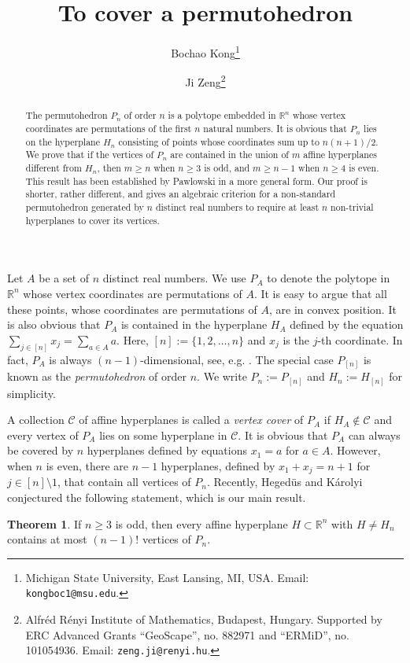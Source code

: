 \documentclass[11pt]{article}
\date{}
\title{To cover a permutohedron}
\author{Bochao Kong\thanks{Michigan State University, East Lansing, MI, USA. Email: {\tt kongboc1@msu.edu}.} \and Ji Zeng\thanks{Alfréd Rényi Institute of Mathematics, Budapest, Hungary. Supported by ERC Advanced Grants ``GeoScape'', no. 882971 and ``ERMiD'', no. 101054936. Email: {\tt zeng.ji@renyi.hu}.}}
\theoremstyle{definition}
\newtheorem{theorem}{Theorem}
\begin{document}
\maketitle

\begin{abstract}
  The permutohedron $P_n$ of order $n$ is a polytope embedded in $\mathbb{R}^n$ whose vertex coordinates are permutations of the first $n$ natural numbers. It is obvious that $P_n$ lies on the hyperplane $H_n$ consisting of points whose coordinates sum up to $n(n+1)/2$. We prove that if the vertices of $P_n$ are contained in the union of $m$ affine hyperplanes different from $H_n$, then $m\geq n$ when $n \geq 3$ is odd, and $m \geq n-1$ when $n \geq 4$ is even. This result has been established by Pawlowski in a more general form. Our proof is shorter, rather different, and gives an algebraic criterion for a non-standard permutohedron generated by $n$ distinct real numbers to require at least $n$ non-trivial hyperplanes to cover its vertices.
\end{abstract}


Let $A$ be a set of $n$ distinct real numbers. We use $P_A$ to denote the polytope in $\mathbb{R}^n$ whose vertex coordinates are permutations of $A$. It is easy to argue that all these points, whose coordinates are permutations of $A$, are in convex position. It is also obvious that $P_A$ is contained in the hyperplane $H_A$ defined by the equation $\sum_{j\in [n]} x_j = \sum_{a\in A} a$. Here, $[n] := \{1,2,\dots,n\}$ and $x_j$ is the $j$-th coordinate. In fact, $P_A$ is always $(n-1)$-dimensional, see, e.g. \cite{ziegler1995lectures}. The special case $P_{[n]}$ is known as the \textit{permutohedron} of order $n$. We write $P_n := P_{[n]}$ and $H_n := H_{[n]}$ for simplicity.

A collection $\mathcal{C}$ of affine hyperplanes is called a \textit{vertex cover} of $P_A$ if $H_A \not\in \mathcal{C}$ and every vertex of $P_A$ lies on some hyperplane in $\mathcal{C}$. It is obvious that $P_A$ can always be covered by $n$ hyperplanes defined by equations $x_1 = a$ for $a \in A$. However, when $n$ is even, there are $n-1$ hyperplanes, defined by $x_1+x_j = n+1$ for $j\in [n]\setminus 1$, that contain all vertices of $P_n$. Recently, Hegedüs and Károlyi~\cite{hegedus2024covering} conjectured the following statement, which is our main result.

\begin{theorem}\label{thm:main}
  If $n\ge 3$ is odd, then every affine hyperplane $H\subset\mathbb{R}^n$ with $H\neq H_n$ contains at most $(n-1)!$ vertices of $P_n$.
\end{theorem}
\end{document}
